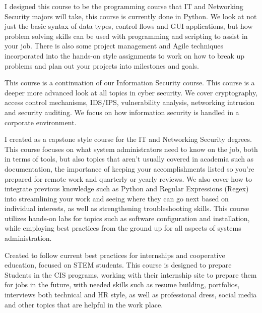 {
{I designed this course to be the programming course that IT and Networking Security majors will take, this course is currently done in Python.  We look at not just the basic syntax of data types, control flows and GUI applications, but how problem solving skills can be used with programming and scripting to assist in your job.  There is also some project management and Agile techniques incorporated into the hands-on style assignments to work on how to break up problems and plan out your projects into milestones and goals.}


{This course is a continuation of our Information Security course.  This course is a deeper more advanced look at all topics in cyber security.  We cover cryptography, access control mechanisms, IDS/IPS, vulnerability analysis, networking intrusion and security auditing.  We focus on how information security is handled in a corporate environment.}

{I created as a capstone style course for the IT and Networking Security degrees.  This course focuses on what system administrators need to know on the job, both in terms of tools, but also topics that aren’t usually covered in academia such as documentation, the importance of keeping your accomplishments listed so you’re prepared for remote work and quarterly or yearly reviews. We also cover how to integrate previous knowledge such as Python and Regular Expressions (Regex) into streamlining your work and seeing where they can go next based on individual interests, as well as strengthening troubleshooting skills. This course utilizes hands-on labs for topics such as software configuration and installation, while employing best practices from the ground up for all aspects of systems administration. }



{Created to follow current best practices for internships and cooperative education, focused on STEM students. This course is designed to prepare Students in the CIS programs, working with their internship site to prepare them for jobs in the future, with needed skills such as resume building, portfolios, interviews both technical and HR style, as well as professional dress, social media and other topics that are helpful in the work place.}
}


